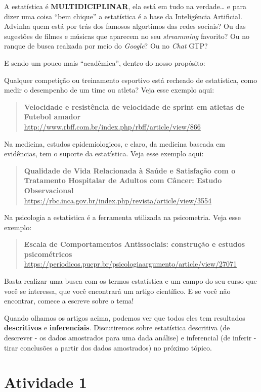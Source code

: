 \documentclass[
]{book}
\begin{document}
A estatística é \textbf{MULTIDICIPLINAR}, ela está em tudo na verdade\ldots{} e para dizer uma coisa ``bem chique'' a estatística é a base da Inteligência Artificial. Advinha quem está por trás dos famosos algortimos das redes sociais? Ou das sugestões de filmes e músicas que aparecem no seu \emph{streamming} favorito? Ou no ranque de busca realzada por meio do \emph{Google}? Ou no \emph{Chat} GTP?

E sendo um pouco mais ``acadêmica'', dentro do nosso propósito:

Qualquer competição ou treinamento esportivo está recheado de estatística, como medir o desempenho de um time ou atleta? Veja esse exemplo aqui:

\begin{quote}
\textbf{Velocidade e resistência de velocidade de sprint em atletas de Futebol amador} \url{http://www.rbff.com.br/index.php/rbff/article/view/866}
\end{quote}

Na medicina, estudos epidemiologicos, e claro, da medicina baseada em evidências, tem o suporte da estatística. Veja esse exemplo aqui:

\begin{quote}
\textbf{Qualidade de Vida Relacionada à Saúde e Satisfação com o Tratamento Hospitalar de Adultos com Câncer: Estudo Observacional}
\url{https://rbc.inca.gov.br/index.php/revista/article/view/3554}
\end{quote}

Na psicologia a estatística é a ferramenta utilizada na psicometria. Veja esse exemplo:

\begin{quote}
\textbf{Escala de Comportamentos Antissociais: construção e estudos psicométricos} \url{https://periodicos.pucpr.br/psicologiaargumento/article/view/27071}
\end{quote}

Basta realizar uma busca com os termos estatística e um campo do seu curso que você se interessa, que você encontrará um artigo científico. E se você não encontrar, comece a escreve sobre o tema!

Quando olhamos os artigos acima, podemos ver que todos eles tem resultados \textbf{descritivos} e \textbf{inferenciais}. Discutiremos sobre estatística descritiva (de descrever - os dados amostrados para uma dada análise) e inferencial (de inferir - tirar conclusões a partir dos dados amostrados) no próximo tópico.

\hypertarget{atividade-1}{%
\section{Atividade 1}\label{atividade-1}}
\end{document}
